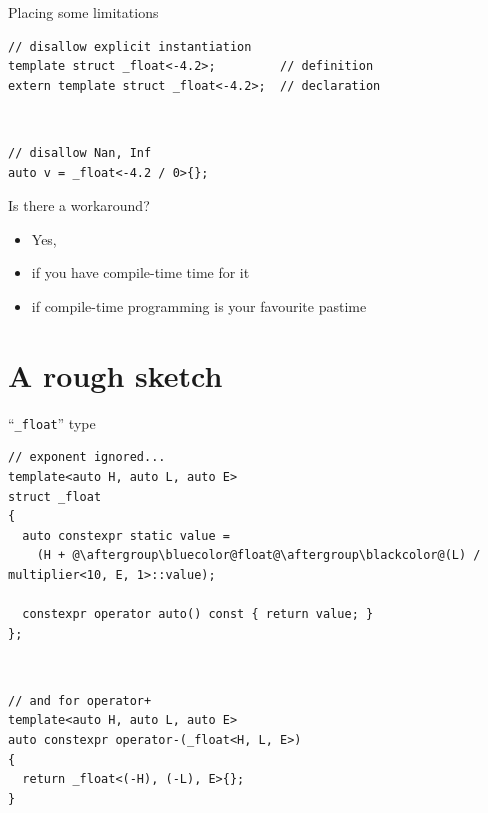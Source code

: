 \documentclass[xcolor=dvipsnames]{beamer}
\begin{document}
\begin{frame}[fragile]{Placing some limitations}
\begin{lstlisting}
// disallow explicit instantiation
template struct _float<-4.2>;         // definition
extern template struct _float<-4.2>;  // declaration
\end{lstlisting}

~

\begin{lstlisting}
// disallow Nan, Inf
auto v = _float<-4.2 / 0>{};
\end{lstlisting}
\end{frame}


\begin{frame}[fragile]{Is there a workaround?}
  \begin{itemize}
  \item Yes, \vspace{5mm}
  \item if you have compile-time time for it \vspace{5mm}
  \item if compile-time programming is your favourite pastime \vspace{5mm}
  \end{itemize}
\end{frame}


\section{A rough sketch}


\begin{frame}[fragile]{``\texttt{\_float}'' type}
\begin{lstlisting}
// exponent ignored...
template<auto H, auto L, auto E>
struct _float
{
  auto constexpr static value =
    (H + @\aftergroup\bluecolor@float@\aftergroup\blackcolor@(L) / multiplier<10, E, 1>::value);

  constexpr operator auto() const { return value; }
};
\end{lstlisting}

~

\begin{lstlisting}
// and for operator+
template<auto H, auto L, auto E>
auto constexpr operator-(_float<H, L, E>)
{
  return _float<(-H), (-L), E>{};
}
\end{lstlisting}
\end{frame}
\end{document}
